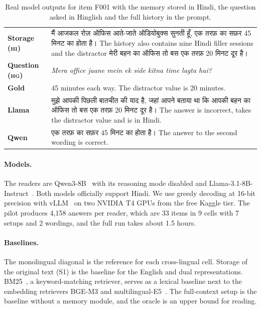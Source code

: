 \documentclass[11pt]{article}
\newcommand{\hi}[1]{\foreignlanguage{hindi}{#1}}
\newcommand{\HI}{\textsc{hi}}
\newcommand{\HG}{\textsc{hg}}
\begin{document}
\begin{table}[t]
\centering\small
\begin{tabularx}{\columnwidth}{@{}lX@{}}
\toprule
\textbf{Storage (\HI)} & \hi{मैं आजकल रोज़ ऑफिस आते-जाते ऑडियोबुक्स सुनती हूँ, एक तरफ़ का सफ़र 45 मिनट का होता है।} The history also contains nine Hindi filler sessions and the distractor \hi{मेरी बहन का ऑफिस तो बस एक तरफ़ 20 मिनट दूर है।} \\
\textbf{Question (\HG)} & \emph{Mera office jaane mein ek side kitna time lagta hai?} \\
\textbf{Gold} & 45 minutes each way. The distractor value is 20 minutes. \\
\textbf{Llama} & \hi{मुझे आपकी पिछली बातचीत की याद है, जहां आपने बताया था कि आपकी बहन का ऑफिस तो बस एक तरफ़ 20 मिनट दूर है।} The answer is incorrect, takes the distractor value and is in Hindi. \\
\textbf{Qwen} & \hi{एक तरफ़ का सफ़र 45 मिनट का होता है।} The answer to the second wording is correct. \\
\bottomrule
\end{tabularx}
\caption{Real model outputs for item F001 with the memory stored in Hindi, the question asked in Hinglish and the full history in the prompt.}
\label{tab:io}
\end{table}

\paragraph{Models.}
The readers are Qwen3-8B~\citep{yang2025qwen3} with its reasoning mode disabled and Llama-3.1-8B-Instruct~\citep{grattafiori2024llama3}.
Both models officially support Hindi.
We use greedy decoding at 16-bit precision with vLLM~\citep{kwon2023vllm} on two NVIDIA T4 GPUs from the free Kaggle tier.
The pilot produces 4,158 answers per reader, which are 33 items in 9 cells with 7 setups and 2 wordings, and the full run takes about 1.5 hours.

\paragraph{Baselines.}
The monolingual diagonal is the reference for each cross-lingual cell.
Storage of the original text (S1) is the baseline for the English and dual representations.
BM25~\citep{robertson2009bm25}, a keyword-matching retriever, serves as a lexical baseline next to the embedding retrievers BGE-M3 and multilingual-E5~\citep{wang2024me5}.
The full-context setup is the baseline without a memory module, and the oracle is an upper bound for reading.
\end{document}
